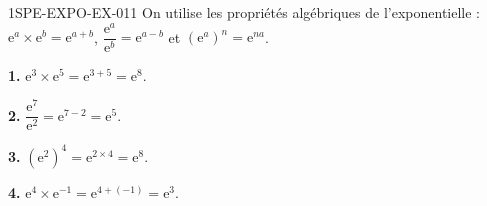 \begin{corrige}{1SPE-EXPO-EX-011}
On utilise les propriétés algébriques de l'exponentielle : $\mathrm{e}^a \times \mathrm{e}^b = \mathrm{e}^{a+b}$, $\dfrac{\mathrm{e}^a}{\mathrm{e}^b} = \mathrm{e}^{a-b}$ et $\left(\mathrm{e}^a\right)^n = \mathrm{e}^{na}$.

\textbf{1.} $\mathrm{e}^3 \times \mathrm{e}^5 = \mathrm{e}^{3+5} = \mathrm{e}^8$.

\textbf{2.} $\dfrac{\mathrm{e}^7}{\mathrm{e}^2} = \mathrm{e}^{7-2} = \mathrm{e}^5$.

\textbf{3.} $\left(\mathrm{e}^2\right)^4 = \mathrm{e}^{2 \times 4} = \mathrm{e}^8$.

\textbf{4.} $\mathrm{e}^4 \times \mathrm{e}^{-1} = \mathrm{e}^{4+(-1)} = \mathrm{e}^3$.
\end{corrige}
